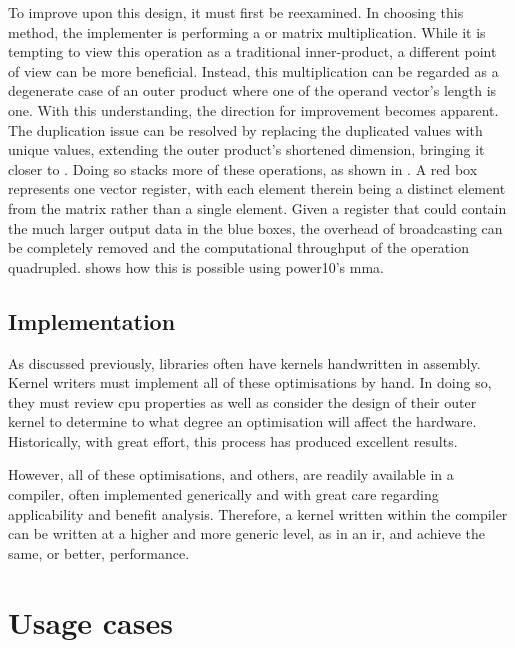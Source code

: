 \documentclass[\main/thesis.tex]{subfiles}
\begin{document}
To improve upon this design, it must first be reexamined.
In choosing this method, the implementer is performing a  or  matrix multiplication.
While it is tempting to view this operation as a traditional inner-product, a different point of view can be more beneficial.
Instead, this multiplication can be regarded as a degenerate case of an outer product where one of the operand vector's length is one.
With this understanding, the direction for improvement becomes apparent.
The duplication issue can be resolved by replacing the duplicated values with unique values, extending the outer product's shortened dimension, bringing it closer to .
Doing so stacks more of these operations, as shown in .
A red box represents one vector register, with each element therein being a distinct element from the matrix rather than a single  element.
Given a register that could contain the much larger output data in the blue boxes, the overhead of broadcasting can be completely removed and the computational throughput of the operation quadrupled.
 shows how this is possible using \gls{power10}'s \gls{mma}.

\subsection{Implementation}
As discussed previously, libraries often have kernels handwritten in assembly.
Kernel writers must implement all of these optimisations by hand.
In doing so, they must review \gls{cpu} properties as well as consider the design of their outer kernel to determine to what degree an optimisation will affect the hardware.
Historically, with great effort, this process has produced excellent results.

However, all of these optimisations, and others, are readily available in a compiler, often implemented generically and with great care regarding applicability and benefit analysis.
Therefore, a kernel written within the compiler can be written at a higher and more generic level, as in an \gls{ir}, and achieve the same, or better, performance.

\section{Usage cases}
\end{document}
